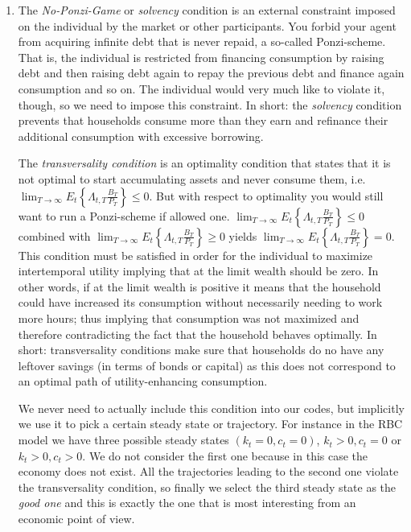 \begin{enumerate}
\item The \emph{No-Ponzi-Game} or \emph{solvency} condition is an external constraint imposed on the individual by the market or other participants.
You forbid your agent from acquiring infinite debt that is never repaid, a so-called Ponzi-scheme.
That is, the individual is restricted from financing consumption by raising debt and then raising debt again to repay the previous debt and finance again consumption and so on.
The individual would very much like to violate it, though, so we need to impose this constraint.
In short: the \emph{solvency} condition prevents that households consume more than they earn and refinance their additional consumption with excessive borrowing.

The \emph{transversality condition} is an optimality condition that states that it is not optimal to start accumulating assets and never consume them, i.e.
\(\lim_{T \rightarrow \infty} E_t \left \{ \Lambda_{t,T} \frac{B_T}{P_T} \right \} \leq 0\).
But with respect to optimality you would still want to run a Ponzi-scheme if allowed one.
\(\lim_{T \rightarrow \infty} E_t \left \{ \Lambda_{t,T} \frac{B_T}{P_T} \right \} \leq 0\)
combined with
\(\lim_{T \rightarrow \infty} E_t \left \{ \Lambda_{t,T} \frac{B_T}{P_T} \right \} \geq 0\)
yields \(\lim_{T \rightarrow \infty} E_t \left \{ \Lambda_{t,T} \frac{B_T}{P_T} \right \} = 0\).
This condition must be satisfied in order for the individual to maximize intertemporal utility implying that at the limit wealth should be zero.
In other words, if at the limit wealth is positive it means that the household could have increased its consumption without necessarily needing to work more hours;
  thus implying that consumption was not maximized and therefore contradicting the fact that the household behaves optimally.
In short: transversality conditions make sure that households do no have any leftover savings (in terms of bonds or capital)
  as this does not correspond to an optimal path of utility-enhancing consumption.
	
We never need to actually include this condition into our codes, but implicitly we use it to pick a certain steady state or trajectory.
For instance in the RBC model we have three possible steady states \((k_t=0,c_t=0)\), \(k_t>0,c_t=0\) or \(k_t>0,c_t>0\).
We do not consider the first one because in this case the economy does not exist.
All the trajectories leading to the second one violate the transversality condition,
  so finally we select the third steady state as the \emph{good one} and this is exactly the one that is most interesting from an economic point of view.


\end{enumerate}
